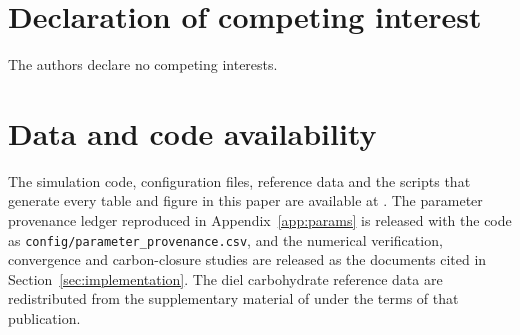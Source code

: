 \documentclass[a4paper,fleqn]{cas-sc}
\begin{document}
\maketitle







\section*{Declaration of competing interest}
The authors declare no competing interests.

\section*{Data and code availability}
The simulation code, configuration files, reference data and the scripts that
generate every table and figure in this paper are available at \FILLINrepo. The
parameter provenance ledger reproduced in Appendix~\ref{app:params} is released
with the code as \texttt{config/parameter\_provenance.csv}, and the numerical
verification, convergence and carbon-closure studies are released as the
documents cited in Section~\ref{sec:implementation}. The diel carbohydrate
reference data are redistributed from the supplementary material of
\citet{Sulpice2014} under the terms of that publication.




\makeatletter
{}
\makeatother
\end{document}
